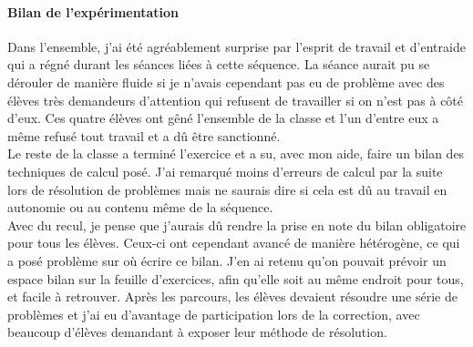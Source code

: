 \paragraph{Bilan de l'expérimentation\\}
Dans l'ensemble, j'ai été agréablement surprise par l'esprit de travail et d'entraide qui a régné durant les séances liées à cette séquence. La séance aurait pu se dérouler de manière fluide si je n'avais cependant pas eu de problème avec des élèves très demandeurs d'attention qui refusent de travailler si on n'est pas à côté d'eux. Ces quatre élèves ont gêné l'ensemble de la classe et l'un d'entre eux a même refusé tout travail et a dû être sanctionné.\\
Le reste de la classe a terminé l'exercice et a su, avec mon aide, faire un bilan des techniques de calcul posé. J'ai remarqué moins d'erreurs de calcul par la suite lors de résolution de problèmes mais ne saurais dire si cela est dû au travail en autonomie ou au contenu même de la séquence.\\
Avec du recul, je pense que j'aurais dû rendre la prise en note du bilan obligatoire pour tous les élèves. Ceux-ci ont cependant avancé de manière hétérogène, ce qui a posé problème sur où écrire ce bilan. J'en ai retenu qu'on pouvait prévoir un espace bilan sur la feuille d'exercices, afin qu'elle soit au même endroit pour tous, et facile à retrouver. Après les parcours, les élèves devaient résoudre une série de problèmes et j'ai eu d'avantage de participation lors de la correction, avec beaucoup d'élèves demandant à exposer leur méthode de résolution.
